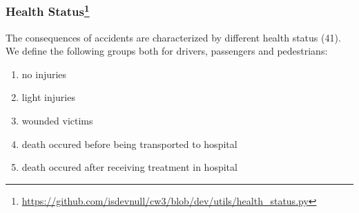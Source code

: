 \subsubsection[Health Status]{Health Status\footnote{\href{https://github.com/isdevnull/cw3/blob/dev/utils/health\_status.py}
{https://github.com/isdevnull/cw3/blob/dev/utils/health\_status.py}}}
The consequences of accidents are characterized by different health status (41). 
We define the following groups both for drivers, passengers and pedestrians:
\begin{enumerate}[noitemsep]
	\item no injuries
	\item light injuries
	\item wounded victims
	\item death occured before being transported to hospital
	\item death occured after receiving treatment in hospital
\end{enumerate}
